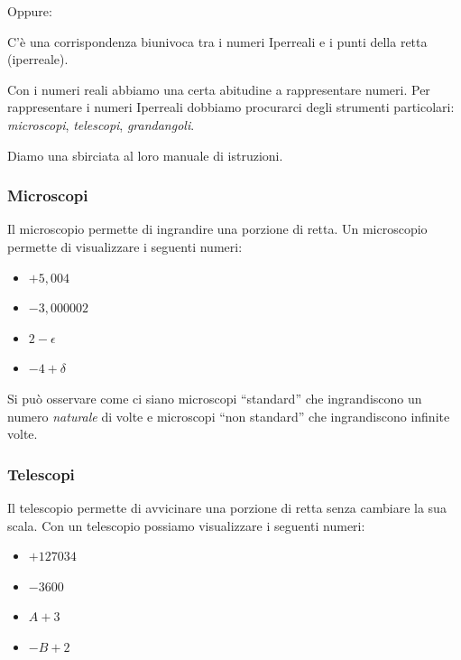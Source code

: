 Oppure:

\begin{postulato}
C'è una corrispondenza biunivoca tra i numeri Iperreali e 
i punti della retta (iperreale).
\end{postulato}

Con i numeri reali abbiamo una certa abitudine a rappresentare numeri.
Per rappresentare i numeri Iperreali dobbiamo procurarci degli strumenti 
particolari: \emph{microscopi}, \emph{telescopi}, \emph{grandangoli}.

Diamo una sbirciata al loro manuale di istruzioni.

\subsubsection{Microscopi}
\label{subsec:insnum_microscopio}

Il microscopio permette di ingrandire una porzione di retta. 
Un microscopio permette di visualizzare i seguenti numeri:

\begin{multicols}{4}
\begin{itemize}
 \item $+5,004$
 \item $-3,000002$
 \item $2-\epsilon$
 \item $-4+\delta$
\end{itemize}
\end{multicols}

Si può osservare come ci siano microscopi ``standard'' che ingrandiscono un 
numero \emph{naturale} di volte e microscopi ``non standard'' che ingrandiscono 
infinite volte.

\subsubsection{Telescopi}
\label{subsec:insnum_microscopio}

Il telescopio permette di avvicinare una porzione di retta senza cambiare la 
sua scala. 
Con un telescopio possiamo visualizzare i seguenti numeri:

\begin{multicols}{4}
\begin{itemize}
 \item $+127034$
 \item $-3600$
 \item $A+3$
 \item $-B+2$
\end{itemize}
\end{multicols}

